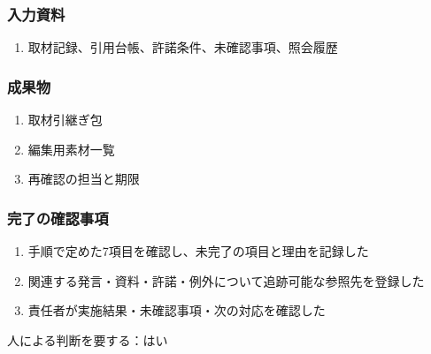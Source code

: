 \documentclass[a4paper,11pt]{article}
\begin{document}
\subsubsection*{入力資料}
\begin{enumerate}[leftmargin=2em,itemsep=0.35em]
\item 取材記録、引用台帳、許諾条件、未確認事項、照会履歴
\end{enumerate}
\subsubsection*{成果物}
\begin{enumerate}[leftmargin=2em,itemsep=0.35em]
\item 取材引継ぎ包
\item 編集用素材一覧
\item 再確認の担当と期限
\end{enumerate}
\subsubsection*{完了の確認事項}
\begin{enumerate}[leftmargin=2em,itemsep=0.35em]
\item 手順で定めた7項目を確認し、未完了の項目と理由を記録した
\item 関連する発言・資料・許諾・例外について追跡可能な参照先を登録した
\item 責任者が実施結果・未確認事項・次の対応を確認した
\end{enumerate}
\par 人による判断を要する：はい\par\medskip
\end{document}
